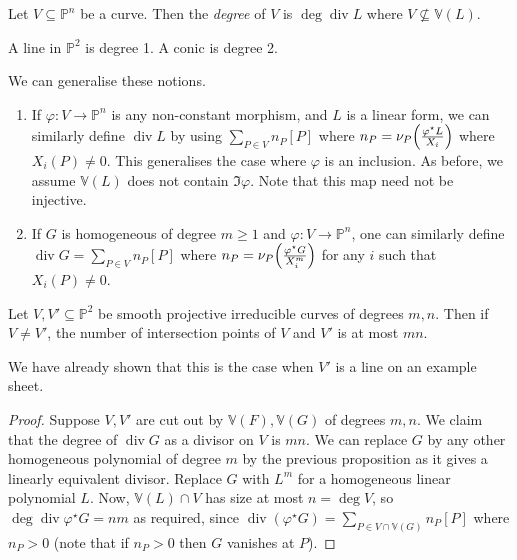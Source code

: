 \begin{definition}
    Let \( V \subseteq \mathbb P^n \) be a curve.
    Then the \emph{degree} of \( V \) is \( \deg \operatorname{div} L \) where \( V \not\subseteq \mathbb V(L) \).
\end{definition}
\begin{remark}
    A line in \( \mathbb P^2 \) is degree 1.
    A conic is degree 2.
\end{remark}
We can generalise these notions.
\begin{enumerate}
    \item If \( \varphi \colon V \to \mathbb P^n \) is any non-constant morphism, and \( L \) is a linear form, we can similarly define \( \operatorname{div}L \) by using \( \sum_{P \in V} n_P [P] \) where \( n_P = \nu_P\qty(\frac{\varphi^\star L}{X_i}) \) where \( X_i(P) \neq 0 \).
    This generalises the case where \( \varphi \) is an inclusion.
    As before, we assume \( \mathbb V(L) \) does not contain \( \Im \varphi \).
    Note that this map need not be injective.
    \item If \( G \) is homogeneous of degree \( m \geq 1 \) and \( \varphi \colon V \to \mathbb P^n \), one can similarly define \( \operatorname{div} G = \sum_{P \in V} n_P [P] \) where \( n_P = \nu_P\qty(\frac{\varphi^\star G}{X_i^m}) \) for any \( i \) such that \( X_i(P) \neq 0 \).
\end{enumerate}
\begin{theorem}
    Let \( V, V' \subseteq \mathbb P^2 \) be smooth projective irreducible curves of degrees \( m, n \).
    Then if \( V \neq V' \), the number of intersection points of \( V \) and \( V' \) is at most \( mn \).
\end{theorem}
We have already shown that this is the case when \( V' \) is a line on an example sheet.
\begin{proof}
    Suppose \( V, V' \) are cut out by \( \mathbb V(F), \mathbb V(G) \) of degrees \( m, n \).
    We claim that the degree of \( \operatorname{div} G \) as a divisor on \( V \) is \( mn \).
    We can replace \( G \) by any other homogeneous polynomial of degree \( m \) by the previous proposition as it gives a linearly equivalent divisor.
    Replace \( G \) with \( L^m \) for a homogeneous linear polynomial \( L \).
    Now, \( \mathbb V(L) \cap V \) has size at most \( n = \deg V \), so \( \deg \operatorname{div} \varphi^\star G = nm \) as required, since \( \operatorname{div}(\varphi^\star G) = \sum_{P \in V \cap \mathbb V(G)} n_P [P] \) where \( n_P > 0 \) (note that if \( n_P > 0 \) then \( G \) vanishes at \( P \)).
\end{proof}
